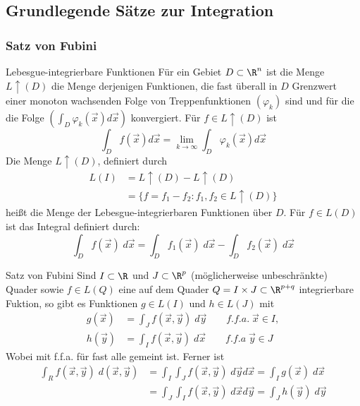 	  \subsection{Grundlegende Sätze zur Integration}
	  \subsubsection{Satz von Fubini}
	  \begin{definition}
	  	Lebesgue-integrierbare Funktionen \newline
	  	Für ein Gebiet $D\subset \R^n$ ist die Menge $L\uparrow(D)$ die Menge derjenigen Funktionen, die fast überall in $D$ Grenzwert einer monoton wachsenden Folge von Treppenfunktionen $(\varphi_k)$ sind und für die die Folge $(\int_D \varphi_k(\vec{x}) d\vec{x})$ konvergiert. Für $f \in L \uparrow (D)$ ist 
	  	\begin{equation}
	  		\int_D f(\vec{x}) d\vec{x} = \lim_{k \to \infty} \int_D \varphi_k(\vec{x}) d\vec{x}
	  	\end{equation}
	  	Die Menge $L\uparrow(D)$, definiert durch
	  	\begin{align}
	  		L(I) &= L\uparrow(D) - L \uparrow (D) \nonumber \\
	  		&= \lbrace f = f_1 - f_2 : f_1, f_2 \in L \uparrow (D) \rbrace 
	  	\end{align}
	  	heißt die Menge der Lebesgue-integrierbaren Funktionen über $D$. Für $f \in L(D)$ ist das Integral definiert durch:
	  	\begin{equation}
	  		 \int_D f(\vec{x})\; d\vec{x} = \int_D f_1(\vec{x})\;d\vec{x} - \int_D f_2(\vec{x})\;d\vec{x}
	  	\end{equation}
	  \end{definition}
	  
	  \begin{satz}
	  	Satz von Fubini \newline
	  	Sind $I \subset \R$ und $J\subset \R^p$ (möglicherweise unbeschränkte) Quader sowie $f \in L(Q)$ eine auf dem Quader $Q = I \times J \subset \R^{p+q}$ integrierbare Fuktion, so gibt es Funktionen $g \in L(I)$ und $h \in L(J)$ mit 
	  	\begin{align}
	  		g(\vec{x}) &= \int_J f(\vec{x}, \vec{y}) \;d\vec{y} \qquad f.f.a. \; \vec{x} \in I,\\
	  		h(\vec{y}) &= \int_I f(\vec{x}, \vec{y}) \; d\vec{x} \qquad f.f.a \; \vec{y} \in J
	  	\end{align}
	  	Wobei mit f.f.a. für fast alle gemeint ist.
	  	Ferner ist
	  	\begin{align}
	  		\int_R f(\vec{x}, \vec{y}) \;d(\vec{x},\vec{y}) &= \int_I \int_J f(\vec{x}, \vec{y})\;d\vec{y} d\vec{x} = \int_I g(\vec{x}) \;d\vec{x} \nonumber \\
	  		&= \int_J\int_I f(\vec{x}, \vec{y})\; d\vec{x} d\vec{y} = \int_J h(\vec{y}) \;d\vec{y}
	  	\end{align}
	  \end{satz}
	  
